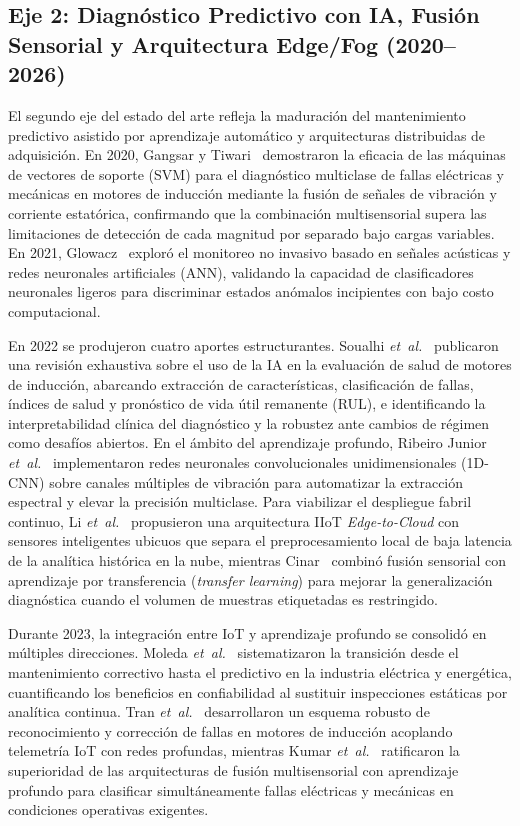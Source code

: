 \subsection{Eje 2: Diagnóstico Predictivo con IA, Fusión Sensorial y Arquitectura Edge/Fog (2020--2026)}\label{subsec:eje2_ia_edge}

El segundo eje del estado del arte refleja la maduración del mantenimiento predictivo asistido por aprendizaje automático y arquitecturas distribuidas de adquisición. En 2020, Gangsar y Tiwari~\cite{Gangsar2020} demostraron la eficacia de las máquinas de vectores de soporte (SVM) para el diagnóstico multiclase de fallas eléctricas y mecánicas en motores de inducción mediante la fusión de señales de vibración y corriente estatórica, confirmando que la combinación multisensorial supera las limitaciones de detección de cada magnitud por separado bajo cargas variables. En 2021, Glowacz~\cite{Glowacz2021} exploró el monitoreo no invasivo basado en señales acústicas y redes neuronales artificiales (ANN), validando la capacidad de clasificadores neuronales ligeros para discriminar estados anómalos incipientes con bajo costo computacional.

En 2022 se produjeron cuatro aportes estructurantes. Soualhi \emph{et~al.}~\cite{Soualhi2022} publicaron una revisión exhaustiva sobre el uso de la IA en la evaluación de salud de motores de inducción, abarcando extracción de características, clasificación de fallas, índices de salud y pronóstico de vida útil remanente (RUL), e identificando la interpretabilidad clínica del diagnóstico y la robustez ante cambios de régimen como desafíos abiertos. En el ámbito del aprendizaje profundo, Ribeiro Junior \emph{et~al.}~\cite{Ribeiro2022} implementaron redes neuronales convolucionales unidimensionales (1D-CNN) sobre canales múltiples de vibración para automatizar la extracción espectral y elevar la precisión multiclase. Para viabilizar el despliegue fabril continuo, Li \emph{et~al.}~\cite{EdgeCloud2022} propusieron una arquitectura IIoT \emph{Edge-to-Cloud} con sensores inteligentes ubicuos que separa el preprocesamiento local de baja latencia de la analítica histórica en la nube, mientras Cinar~\cite{SensorFusion2022} combinó fusión sensorial con aprendizaje por transferencia (\emph{transfer learning}) para mejorar la generalización diagnóstica cuando el volumen de muestras etiquetadas es restringido.

Durante 2023, la integración entre IoT y aprendizaje profundo se consolidó en múltiples direcciones. Moleda \emph{et~al.}~\cite{Maintenance2023} sistematizaron la transición desde el mantenimiento correctivo hasta el predictivo en la industria eléctrica y energética, cuantificando los beneficios en confiabilidad al sustituir inspecciones estáticas por analítica continua. Tran \emph{et~al.}~\cite{Tran2023} desarrollaron un esquema robusto de reconocimiento y corrección de fallas en motores de inducción acoplando telemetría IoT con redes profundas, mientras Kumar \emph{et~al.}~\cite{Kumar2023} ratificaron la superioridad de las arquitecturas de fusión multisensorial con aprendizaje profundo para clasificar simultáneamente fallas eléctricas y mecánicas en condiciones operativas exigentes.

